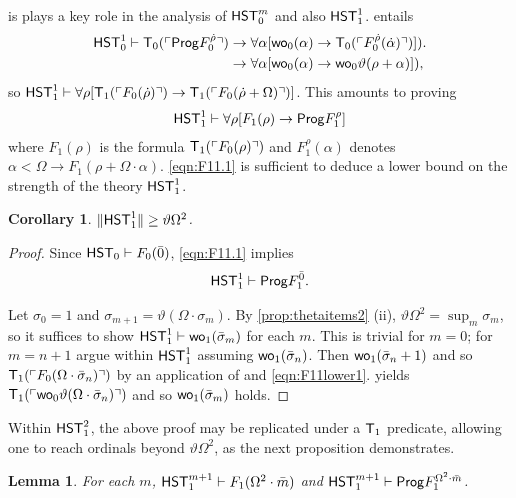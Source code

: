 \documentclass[UKenglish,cleveref,DIV=12]{scrartcl}
\newtheorem{lemma}[theorem]{Lemma}%
\newtheorem{corollary}[lemma]{Corollary}
\theoremstyle{definition}
\theoremstyle{definition}
\begin{document}
 is plays a key role in the analysis of $\mathsf{HST}_0^m$ and also $\mathsf{HST}_1^1$.  entails
\begin{align*}
 \mathsf{HST}_0^1\vdash\mathsf{T}_0(\ulcorner{\mathsf{Prog}F_0^{\dot\rho}}\urcorner)
	&\rightarrow {\forall\alpha[\mathsf{wo}_0(\alpha)\rightarrow \mathsf{T}_0(\ulcorner{F_0^{\dot\rho}(\dot\alpha)}\urcorner)]}).\\
	&\rightarrow {\forall\alpha[\mathsf{wo}_0(\alpha)\rightarrow \mathsf{wo}_0\vartheta(\rho+\alpha)]}),
\end{align*}
so $\mathsf{HST}_1^1\vdash \forall\rho[\mathsf{T}_1(\ulcorner{F_0(\dot\rho)}\urcorner)\rightarrow \mathsf{T}_1(\ulcorner{F_0(\dot\rho+\Omega)}\urcorner)]$. This amounts to proving
\begin{align}\label{eqn:F11.1}
  \mathsf{HST}_1^1\vdash \forall\rho[{F_1(\rho)}\rightarrow \mathsf{Prog}  F_1^\rho]
\end{align}
where $F_1(\rho)$ is the formula $\mathsf{T}_1(\ulcorner{F_0(\rho)}\urcorner)$ and
$F_1^\rho(\alpha)$ denotes $\alpha<\Omega\rightarrow F_1(\rho+\Omega\cdot\alpha)$.
\eqref{eqn:F11.1} is sufficient to deduce a lower bound on the strength of the
theory $\mathsf{HST}_1^1$.
\begin{corollary}\label{cor:F11lowerbound}
  $\lVert{\mathsf{HST}_1^1}\rVert\ge\vartheta\Omega^2$.
\end{corollary}
\begin{proof}
Since $\mathsf{HST}_0\vdash F_0(\bar0)$, \eqref{eqn:F11.1} implies
\begin{gather}\label{eqn:F11lower1}
 \mathsf{HST}_1^1\vdash \mathsf{Prog}  F^{\bar 0}_1.
\end{gather}

Let $\sigma_0=1$ and $\sigma_{m+1}=\vartheta(\Omega\cdot\sigma_m)$. By
\cref{prop:thetaitems2} (ii), $\vartheta\Omega^2=\sup_m\sigma_m$, so it
suffices to show $\mathsf{HST}_1^1\vdash\mathsf{wo}_1(\bar\sigma_m)$ for each $m$. This is
trivial for $m=0$; for $m=n+1$ argue within $\mathsf{HST}_1^1$ assuming
$\mathsf{wo}_1(\bar\sigma_n)$. Then $\mathsf{wo}_1(\bar\sigma_n+1)$ and so $\mathsf{T}_1(\ulcorner{F_0(\Omega\cdot\bar\sigma_n)}\urcorner)$
by an application of  and \eqref{eqn:F11lower1}.  yields $\mathsf{T}_1(\ulcorner{\mathsf{wo}_0\vartheta(\Omega\cdot\bar\sigma_n)}\urcorner)$ and so $\mathsf{wo}_1(\bar\sigma_m)$
holds.
\end{proof}
Within $\mathsf{HST}_1^2$, the above proof may be replicated under a $\mathsf{T}_1$ predicate,
allowing one to reach ordinals beyond $\vartheta\Omega^2$, as the next
proposition demonstrates.
\begin{lemma}\label{prop:F1wellordering}
For each $m$, $\mathsf{HST}_1^{m+1}\vdash F_1(\Omega^2\cdot\bar m)$ and $\mathsf{HST}_1^{m+1}\vdash \mathsf{Prog}  F_1^{\Omega^2\cdot\bar m}$.
\end{lemma}
\end{document}
